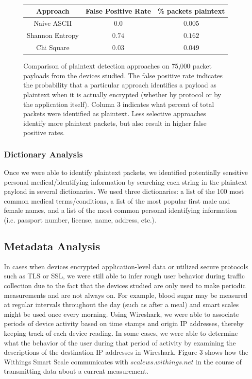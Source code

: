 \begin{figure}
  \begin{center}
    \begin{tabular}{c|c|c} 
    \textbf{Approach} & \textbf{False Positive Rate} & \textbf{\% packets plaintext}\\ [0.5ex] 
    \hline
    Naive ASCII & $0.0$ & $0.005$ \\ 
    Shannon Entropy &  $0.74$ & $0.162$ \\
    Chi Square & $0.03$ & $0.049$ \\
    \end{tabular}
    \caption{Comparison of plaintext detection approaches on 75,000 packet payloads from the devices studied. The false positive rate indicates the probability that a particular approach identifies a payload as plaintext when it is actually encrypted (whether by protocol or by the application itself). Column 3 indicates what percent of total packets were identified as plaintext. Less selective approaches identify more plaintext packets, but also result in higher false positive rates.}
    \label{fig:method-comp}
  \end{center}
\end{figure}

\subsubsection{Dictionary Analysis}
Once we were able to identify plaintext packets, we identified potentially sensitive personal medical/identifying information by searching each string in the plaintext payload in several dictionaries. We used three dictionaries: a list of the 100 most common medical terms/conditions, a list of the most popular first male and female names, and a list of the most common personal identifying information (i.e. passport number, license, name, address, etc.). 

\subsection{Metadata Analysis}
In cases when devices encrypted application-level data or utilized secure protocols such as TLS or SSL, we were still able to infer rough user behavior during traffic collection due to the fact that the devices studied are only used to make periodic measurements and are not always on. For example, blood sugar may be measured at regular intervals throughout the day (such as after a meal) and smart scales might be used once every morning. Using Wireshark, we were able to associate periods of device activity based on time stamps and origin IP addresses, thereby keeping track of each device reading. In some cases, we were able to determine what the behavior of the user during that period of activity by examining the descriptions of the destination IP addresses in Wireshark. Figure 3 shows how the Withings Smart Scale communicates with $scalews.withings.net$ in the course of transmitting data about a current measurement.

